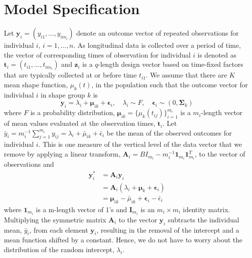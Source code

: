 \documentclass[12pt]{article}
\newcommand{\B}[0]{\mathbf}
\newcommand{\bs}[0]{\boldsymbol}
\begin{document}
\section{Model Specification}
 Let $\B y_{i}=(y_{i1},...,y_{im_{i}})$ denote an outcome vector of repeated observations for individual $i$, $i=1,...,n$. As longitudinal data is collected over a period of time, the vector of corresponding times of observation for individual $i$ is denoted as $\B t_{i}=(t_{i1},...,t_{im_{i}})$ and $\B z_{i}$ is a $q$-length design vector based on time-fixed factors that are typically collected at or before time $t_{i1}$. We assume that there are $K$ mean shape function, $\mu_{k}(t)$, in the population such that the outcome vector for individual $i$ in shape group $k$ is
 $$\B y_{i} = \lambda_{i}+\bs\mu_{ik}+\bs\epsilon_{i},\quad \lambda_{i}\sim F, \quad \bs\epsilon_{i}\sim(0,\bs\Sigma_{k})$$
 where $F$ is a probability distribution, $\bs\mu_{ik} = \{\mu_{k}(t_{ij})\}_{i=1}^{m_{i}}$ is a $m_{i}$-length vector of mean values evaluated at the observation times, $\B t_{i}$. Let $\bar{y}_{i}= m_{i}^{-1}\sum^{m_{i}}_{j=1} y_{ij} = \lambda_{i}+\bar{\mu}_{ik}+\bar{\epsilon}_{i}$ be the mean of the observed outcomes for individual $i$. This is one measure of the vertical level of the data vector that we remove by applying a linear transform, $\B A_{i} = B I_{m_{i}} - m_{i}^{-1}\B 1_{m_{i}}\B 1_{m_{i}}^{T}$, to the vector of observations and 
\begin{align*}
\B y^{*}_{i} &= \B A_{i}\B y_{i}\\
&=\B A_{i}(\lambda_{i}+\bs\mu_{k}+\bs\epsilon_{i})\\
&=\bs\mu_{ik}-\bar{\mu}_{ik}+\bs\epsilon_{i}-\bar{\epsilon}_{i}
\end{align*}
where $\B 1_{m_{i}}$ is a m-length vector of 1's and $\B I_{m_{i}}$ is an $m_{i}\times m_{i}$ identity matrix. Multiplying the symmetric matrix $\B A_{i}$ to the vector $\B y_{i}$ subtracts the individual mean, $\bar{y}_{i}$, from each element $\B y_{i}$, resulting in the removal of the intercept and a mean function shifted by a constant. Hence, we do not have to worry about the distribution of the random intercept, $\lambda_{i}$.\\
\end{document}
